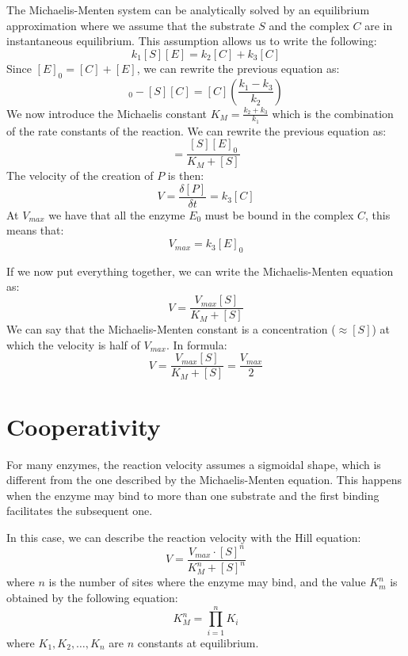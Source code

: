 The Michaelis-Menten system can be analytically solved by an equilibrium
approximation where we assume that the substrate $S$ and the complex $C$ are in
instantaneous equilibrium. This assumption allows us to write the following:
\begin{equation}
    k_1[S][E] = k_2[C] + k_3[C]
\end{equation}
Since $[E]_0 = [C] + [E]$, we can rewrite the previous equation as:
\begin{equation}
    [S][E]_0 - [S][C] = [C]\left( \frac{k_1 - k_3}{k_2}\right)
\end{equation}
We now introduce the Michaelis constant $K_M = \frac{k_2 + k_3}{k_1}$ which is
the combination of the rate constants of the reaction. We can rewrite the previous
equation as:
\begin{equation}
    [C] = \frac{[S][E]_0}{K_M + [S]}
\end{equation}
The velocity of the creation of $P$ is then:
\begin{equation}
    V = \frac{\delta [P]}{\delta t} = k_3[C]
\end{equation}
At $V_{max}$ we have that all the enzyme $E_0$ must be bound in the complex $C$,
this means that:
\begin{equation}
    V_{max} = k_3[E]_0
\end{equation}

If we now put everything together, we can write the Michaelis-Menten equation as:
\begin{equation}
    V = \frac{V_{max}[S]}{K_M + [S]}
\end{equation}
We can say that the Michaelis-Menten constant is a concentration ($\approx [S]$)
at which the velocity is half of $V_{max}$. In formula:
\begin{equation}
    V = \frac{V_{max}[S]}{K_M + [S]} = \frac{V_{max}}{2}
\end{equation}
\section{Cooperativity}
For many enzymes, the reaction velocity assumes a sigmoidal shape, which is 
different from the one described by the Michaelis-Menten equation. This happens 
when the enzyme may bind to more than one substrate and the first binding facilitates
the subsequent one.

In this case, we can describe the reaction velocity with the Hill equation:
\begin{equation}
    V = \frac{V_{max} \cdot [S]^n}{K_M^n + [S]^n}
\end{equation}
where $n$ is the number of sites where the enzyme may bind, and the value $K_m^n$
is obtained by the following equation:
\begin{equation}
    K_M^n = \prod_{i = 1}^n K_i
\end{equation}
where $K_1, K_2, \ldots, K_n$ are $n$ constants at equilibrium.


